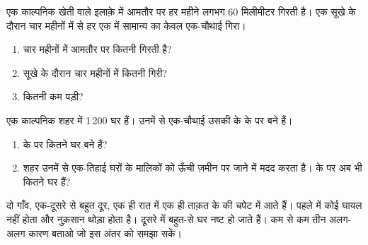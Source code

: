 \begin{exercise}[$\star\star$]\label{exo:g5:natural-hazards:9}
एक काल्पनिक खेती वाले इलाक़े में आमतौर पर हर महीने लगभग 60 मिलीमीटर  गिरती
है। एक सूखे के दौरान चार महीनों में से हर एक में सामान्य  का केवल एक-चौथाई
गिरा।
\begin{enumerate}
  \item[(क)] चार महीनों में आमतौर पर कितनी  गिरती है?
  \item[(ख)] सूखे के दौरान चार महीनों में कितनी गिरी?
  \item[(ग)] कितनी  कम पड़ी?
\end{enumerate}
\end{exercise}

\begin{exercise}[$\star\star$]\label{exo:g5:natural-hazards:10}
एक काल्पनिक शहर में 1\,200 घर हैं। उनमें से एक-चौथाई उसकी  के  के  पर
बने हैं।
\begin{enumerate}
  \item[(क)]  के  पर कितने घर बने हैं?
  \item[(ख)] शहर उनमें से एक-तिहाई घरों के मालिकों को ऊँची ज़मीन पर जाने में मदद
        करता है।  के  पर अब भी कितने घर हैं?
\end{enumerate}
\end{exercise}

\begin{exercise}[$\star\star\star$]\label{exo:g5:natural-hazards:11}
दो गाँव, एक-दूसरे से बहुत दूर, एक ही रात में एक ही ताक़त के  की चपेट में
आते हैं। पहले में कोई घायल नहीं होता और नुक़सान थोड़ा होता है। दूसरे में बहुत-से
घर नष्ट हो जाते हैं। कम से कम तीन अलग-अलग कारण बताओ जो इस अंतर को समझा
सकें।
\end{exercise}
